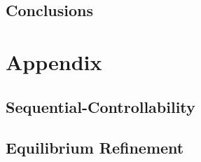 \documentclass[12pt]{report}
\theoremstyle{definition}
\begin{document}
\chapter{Conclusions}


\appendix
\part*{Appendix}

  \parttoc

  \chapter{Sequential-Controllability}
  

  \chapter{Equilibrium Refinement}
  


% 

% 



\end{document}
